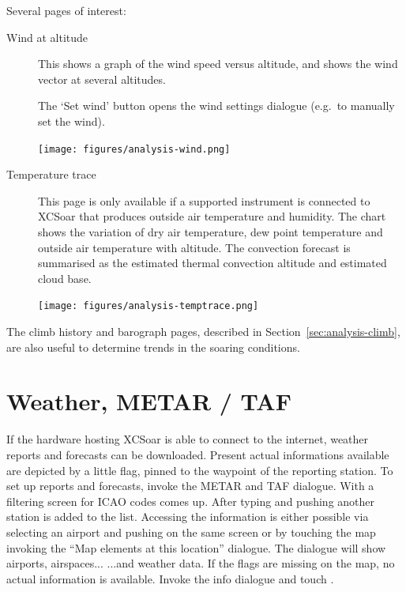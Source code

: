 Several pages of interest:
\begin{description}

\item[Wind at altitude]
  This shows a graph of the wind speed versus altitude, and shows the
  wind vector at several altitudes.

The `Set wind' button opens the wind settings dialogue (e.g.\ to
manually set the wind).

\begin{center}
\texttt{[image: figures/analysis-wind.png]}
\end{center}

\item[Temperature trace]
  This page is only available if a supported instrument is connected
  to XCSoar that produces outside air temperature and humidity.  The
  chart shows the variation of dry air temperature, dew point
  temperature and outside air temperature with altitude.  The convection
  forecast is summarised as the estimated thermal convection altitude
  and estimated cloud base.

\begin{center}
\texttt{[image: figures/analysis-temptrace.png]}
\end{center}

\end{description}
The climb history and barograph pages, described in
Section~\ref{sec:analysis-climb}, are also useful to determine
trends in the soaring conditions.

\section{Weather, METAR / TAF}\label{sec:metar-taf}

If the hardware hosting XCSoar is able to connect to the internet, weather 
reports and forecasts can be downloaded.  Present actual informations available are depicted by a 
little flag, pinned to the waypoint of the reporting station. 
 To 
set up reports and forecasts, invoke the METAR and TAF dialogue. With 
 a filtering screen for ICAO codes comes up. After typing and 
pushing another station is added to the list. Accessing the 
information is either possible via selecting an airport and pushing 
 on the same screen or by touching the map invoking the ``Map 
elements at this location'' dialogue. The dialogue will show airports, 
airspaces... ...and weather data. If the flags are missing on the map, no 
actual information is available. Invoke the info dialogue and touch 
.

